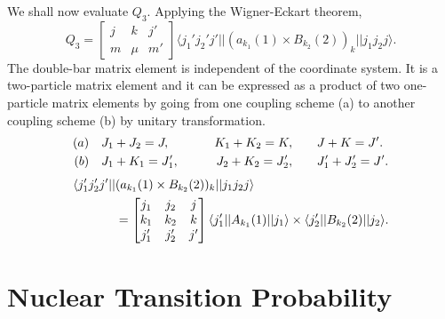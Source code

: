 We shall now evaluate $Q_3$. Applying the Wigner-Eckart theorem,
\begin{equation}
  Q_3 =
  \begin{bmatrix}    j & k & j'\\    m & \mu & m'  \end{bmatrix}
  \langle j_1' j_2' j' || (a_{k_1}(1) \times B_{k_2}(2))_k || j_1 j_2 j \rangle. \label{chap3-eq22}
\end{equation}
The double-bar matrix element is independent of the coordinate system. It is a two-particle matrix element and it can be expressed as a product of two one-particle matrix elements by going from one coupling scheme (a) to another coupling scheme (b) by unitary transformation.
\begin{alignat*}{3}
  (a) \quad&  {\boldmath  J}_1 + {\boldmath  J}_2 = {\boldmath  J}, \qquad &{\boldmath  K}_1+ {\boldmath  K}_2= {\boldmath  K}, \qquad &{\boldmath  J} + {\boldmath  K}= {\boldmath  J}'.\\
  (b) \quad &{\boldmath  J}_1 + {\boldmath  K}_1 = {\boldmath  J}_1', \qquad &{\boldmath  J}_2+{\boldmath  K}_2= {\boldmath  J}_2', \qquad & {\boldmath  J}_1'+{\boldmath  J}_2'={\boldmath  J}'.
\end{alignat*}
\begin{align}
  \langle j_1' j_2' j' || & (a_{k_1}(1) \times B_{k_2}(2))_k ||  j_1 j_2 j \rangle \notag \\
  & =  \begin{bmatrix} j_1 & j_2 & j\\ k_1 & k_2 & k \\ j_1' & j_2' & j'  \end{bmatrix}
  \langle j_1' || A_{k_1}(1)|| j_1 \rangle \times \langle j_2' || B_{k_2} (2)|| j_2 \rangle . \label{chap3-eq23}
\end{align}

\section{Nuclear Transition Probability}\label{chap3-sec3}

